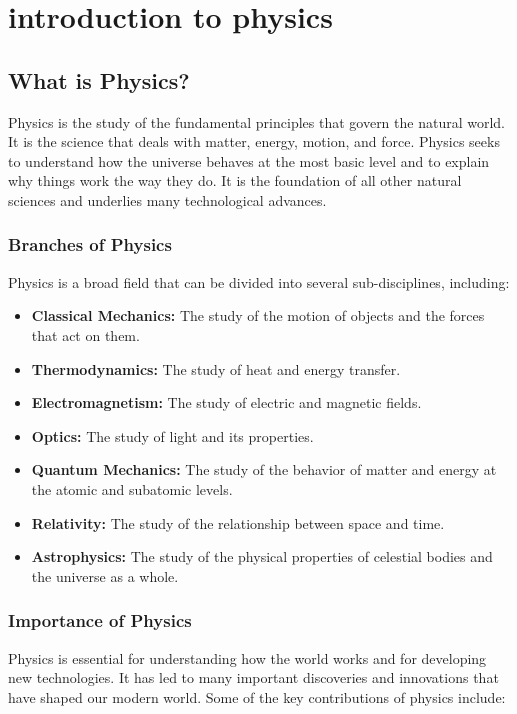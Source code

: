\chapter{introduction to physics}
\section{What is Physics?}

Physics is the study of the fundamental principles that govern the natural world. It is the science that deals with matter, energy, motion, and force. Physics seeks to understand how the universe behaves at the most basic level and to explain why things work the way they do. It is the foundation of all other natural sciences and underlies many technological advances.

\subsection{Branches of Physics}

Physics is a broad field that can be divided into several sub-disciplines, including:

\begin{itemize}
    \item \textbf{Classical Mechanics:} The study of the motion of objects and the forces that act on them.
    \item \textbf{Thermodynamics:} The study of heat and energy transfer.
    \item \textbf{Electromagnetism:} The study of electric and magnetic fields.
    \item \textbf{Optics:} The study of light and its properties.
    \item \textbf{Quantum Mechanics:} The study of the behavior of matter and energy at the atomic and subatomic levels.
    \item \textbf{Relativity:} The study of the relationship between space and time.
    \item \textbf{Astrophysics:} The study of the physical properties of celestial bodies and the universe as a whole.
    
\end{itemize}

\subsection{Importance of Physics}

Physics is essential for understanding how the world works and for developing new technologies. It has led to many important discoveries and innovations that have shaped our modern world. Some of the key contributions of physics include:

